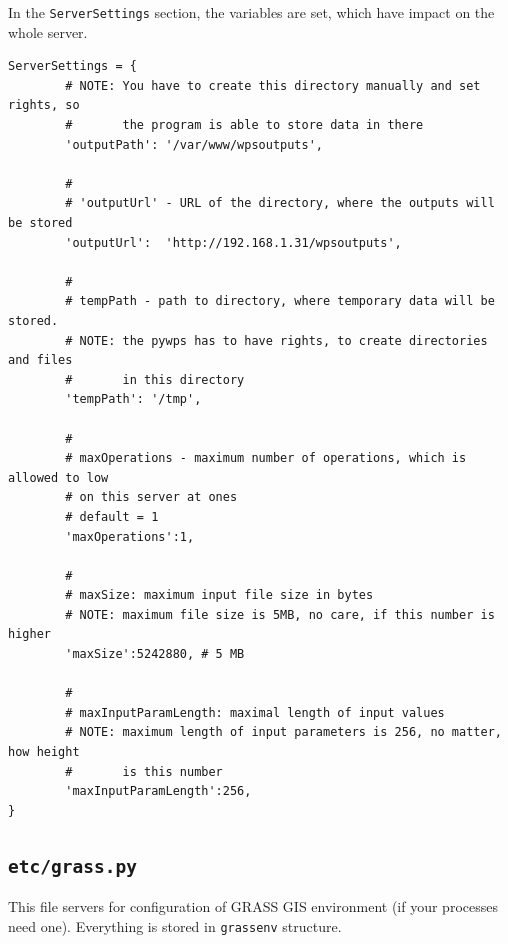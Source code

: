 \documentclass[a4paper,11pt]{article}
\begin{document}
    
In the \texttt{ServerSettings} section, the variables are set, which have impact on
the whole server.
    

\begin{verbatim}
ServerSettings = {
        # NOTE: You have to create this directory manually and set rights, so
        #       the program is able to store data in there 
        'outputPath': '/var/www/wpsoutputs',
        
        #
        # 'outputUrl' - URL of the directory, where the outputs will be stored
        'outputUrl':  'http://192.168.1.31/wpsoutputs',
        
        #
        # tempPath - path to directory, where temporary data will be stored.
        # NOTE: the pywps has to have rights, to create directories and files
        #       in this directory
        'tempPath': '/tmp',
        
        #
        # maxOperations - maximum number of operations, which is allowed to low
        # on this server at ones 
        # default = 1
        'maxOperations':1,
        
        #
        # maxSize: maximum input file size in bytes
        # NOTE: maximum file size is 5MB, no care, if this number is higher
        'maxSize':5242880, # 5 MB
        
        #
        # maxInputParamLength: maximal length of input values
        # NOTE: maximum length of input parameters is 256, no matter, how height
        #       is this number
        'maxInputParamLength':256,
}
\end{verbatim}


\subsection{\texttt{etc/grass.py}}
    
This file servers for configuration of GRASS GIS environment (if your
processes need one). Everything is stored in \texttt{grassenv} structure. 
    
\end{document}
